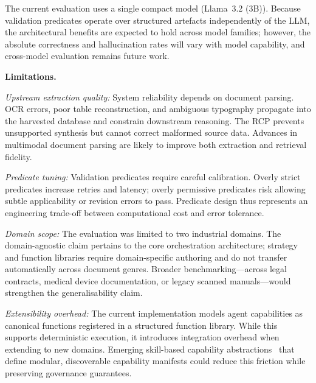 \documentclass[largeformat]{interact}
\begin{document}
The current evaluation uses a single compact model (Llama~3.2 (3B)). Because validation predicates operate over structured artefacts independently of the LLM, the architectural benefits are expected to hold across model families; however, the absolute correctness and hallucination rates will vary with model capability, and cross-model evaluation remains future work.

\vspace{1.0em}
\noindent \textbf{Limitations.}

 \vspace{1.0em}
    \noindent \textit{Upstream extraction quality:} System reliability depends on document parsing. OCR errors, poor table reconstruction, and ambiguous typography propagate into the harvested database and constrain downstream reasoning. The RCP prevents unsupported synthesis but cannot correct malformed source data. Advances in multimodal document parsing are likely to improve both extraction and retrieval fidelity.
\vspace{0.5em}

    \noindent \textit{Predicate tuning:} Validation predicates require careful calibration. Overly strict predicates increase retries and latency; overly permissive predicates risk allowing subtle applicability or revision errors to pass. Predicate design thus represents an engineering trade-off between computational cost and error tolerance.
\vspace{0.5em}

    \noindent \textit{Domain scope:} The evaluation was limited to two industrial domains. The domain-agnostic claim pertains to the core orchestration architecture; strategy and function libraries require domain-specific authoring and do not transfer automatically across document genres. Broader benchmarking---across legal contracts, medical device documentation, or legacy scanned manuals---would strengthen the generalisability claim.
\vspace{0.5em}

    \noindent \textit{Extensibility overhead:} The current implementation models agent capabilities as canonical functions registered in a structured function library. While this supports deterministic execution, it introduces integration overhead when extending to new domains. Emerging skill-based capability abstractions~\cite{agentskills2024} that define modular, discoverable capability manifests could reduce this friction while preserving governance guarantees.
\vspace{0.5em}
\end{document}
